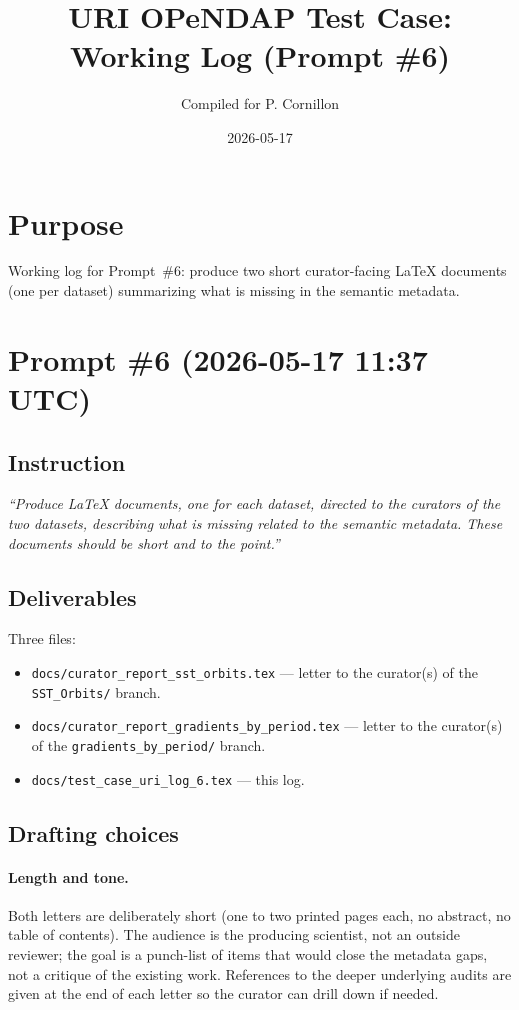 \documentclass[11pt]{article}
\title{URI OPeNDAP Test Case: Working Log (Prompt \#6)}
\author{Compiled for P. Cornillon}
\date{2026-05-17}
\begin{document}
\maketitle

\section*{Purpose}

Working log for Prompt~\#6: produce two short curator-facing
LaTeX documents (one per dataset) summarizing what is missing in
the semantic metadata.

\section{Prompt \#6 (2026-05-17 11:37 UTC)}

\subsection{Instruction}

\emph{``Produce LaTeX documents, one for each dataset, directed to
the curators of the two datasets, describing what is missing
related to the semantic metadata. These documents should be short
and to the point.''}

\subsection{Deliverables}

Three files:

\begin{itemize}
  \item \texttt{docs/curator\_report\_sst\_orbits.tex} --- letter
    to the curator(s) of the \texttt{SST\_Orbits/} branch.
  \item \texttt{docs/curator\_report\_gradients\_by\_period.tex}
    --- letter to the curator(s) of the
    \texttt{gradients\_by\_period/} branch.
  \item \texttt{docs/test\_case\_uri\_log\_6.tex} --- this log.
\end{itemize}

\subsection{Drafting choices}

\paragraph{Length and tone.} Both letters are deliberately short
(one to two printed pages each, no abstract, no table of
contents). The audience is the producing scientist, not an outside
reviewer; the goal is a punch-list of items that would close the
metadata gaps, not a critique of the existing work. References to
the deeper underlying audits are given at the end of each letter
so the curator can drill down if needed.
\end{document}
